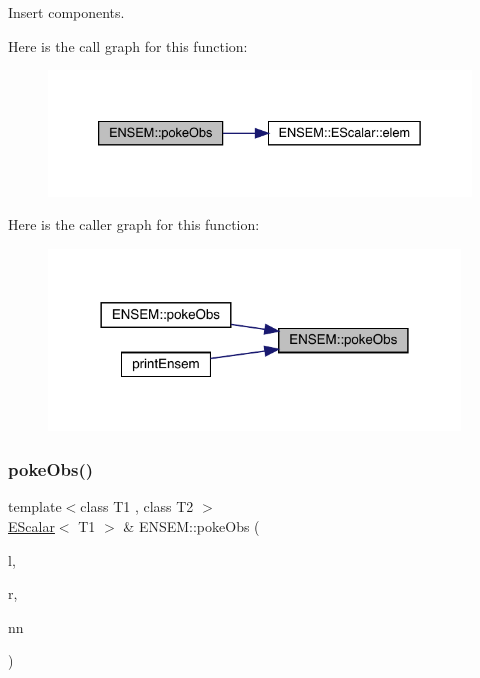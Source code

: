 Insert components. 

Here is the call graph for this function\+:
\nopagebreak
\begin{figure}[H]
\begin{center}
\leavevmode
\includegraphics[width=333pt]{d4/dca/group__escalar_ga635de79045bc1565a78ea94b9ff967fb_cgraph}
\end{center}
\end{figure}
Here is the caller graph for this function\+:
\nopagebreak
\begin{figure}[H]
\begin{center}
\leavevmode
\includegraphics[width=310pt]{d4/dca/group__escalar_ga635de79045bc1565a78ea94b9ff967fb_icgraph}
\end{center}
\end{figure}
\mbox{\label{group__escalar_gad25640d827b75330c6d3f288290866fd}} 
\subsubsection{\texorpdfstring{pokeObs()}{pokeObs()}\hspace{0.1cm}{\footnotesize\ttfamily [2/2]}}
{\footnotesize\ttfamily template$<$class T1 , class T2 $>$ \\
\mbox{\hyperlink{classENSEM_1_1EScalar}{E\+Scalar}}$<$ T1 $>$ \& E\+N\+S\+E\+M\+::poke\+Obs (\begin{DoxyParamCaption}\item[{\mbox{\hyperlink{classENSEM_1_1EScalar}{E\+Scalar}}$<$ T1 $>$ \&}]{l,  }\item[{const \mbox{\hyperlink{classENSEM_1_1EScalar}{E\+Scalar}}$<$ T2 $>$ \&}]{r,  }\item[{const \mbox{\hyperlink{classXMLArray_1_1Array}{Array}}$<$ int $>$ \&}]{nn }\end{DoxyParamCaption})\hspace{0.3cm}{\ttfamily [inline]}}

